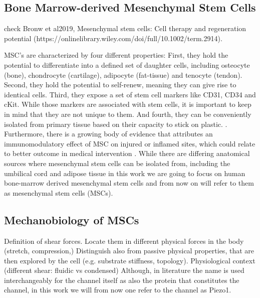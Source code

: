 \subsection{Bone Marrow-derived Mesenchymal Stem Cells}

check Bronw et al2019, Mesenchymal stem cells: Cell therapy and regeneration potential (https://onlinelibrary.wiley.com/doi/full/10.1002/term.2914). 

MSC's are characterized by four different properties: First, they hold the potential to differentiate into a defined set of daughter cells, including osteocyte (bone), chondrocyte (cartilage), adipocyte (fat-tissue) and tenocyte (tendon).\cite{Ng2008} Second, they hold the potential to self-renew, meaning they can give rise to identical cells. Third, they expose a set of stem cell markers like CD31, CD34 and cKit. While those markers are associated with stem cells, it is important to keep in mind that they are not unique to them. \cite{Battula2009} And fourth, they can be conveniently isolated from primary tissue based on their capacity to stick on plastic. \cite{Buhring2007}. Furthermore, there is a growing body of evidence that attributes an immunomodulatory effect of MSC on injured or inflamed sites, which could relate to better outcome in medical intervention \cite{Hass2011, Caplan2011}.
While there are differing anatomical sources where mesenchymal stem cells can be isolated from, including the umbilical cord and adipose tissue \cite{Barlow2008, Hass2011} in this work we are going to focus on human bone-marrow derived mesenchymal stem cells and from now on will refer to them as mesenchymal stem cells (MSCs).

\subsection{Mechanobiology of MSCs}
Definition of shear forces. Locate them in different physical forces in the body (stretch, compression,) Distinguish also from passive physical properties, that are then explored by the cell (e.g. substrate stiffness, topology).
Physiological context (different shear: fluidic vs condensed)
Although, in literature the name \Piezo{} is used interchangeably for the channel itself as also the protein that constitutes the channel, in this work we will from now one refer to the channel as Piezo1.

